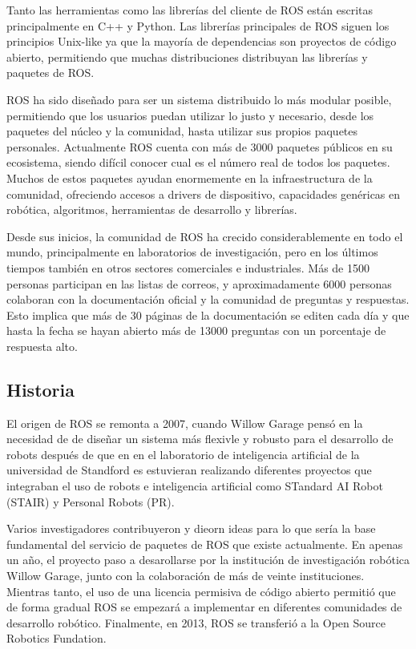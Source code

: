 Tanto las herramientas como las librerías del cliente de ROS están escritas
principalmente en C++ y Python. Las librerías principales de ROS siguen los
principios Unix-like ya que la mayoría de dependencias son proyectos de código
abierto, permitiendo que muchas distribuciones distribuyan las librerías y
paquetes de ROS.

ROS ha sido diseñado para ser un sistema distribuido lo más modular posible,
permitiendo que los usuarios puedan utilizar lo justo y necesario, desde los
paquetes del núcleo y la comunidad, hasta utilizar sus propios paquetes
personales. Actualmente ROS cuenta con más de 3000 paquetes públicos en su
ecosistema, siendo difícil conocer cual es el número real de todos los paquetes.
Muchos de estos paquetes ayudan enormemente en la infraestructura de la
comunidad, ofreciendo accesos a drivers de dispositivo, capacidades genéricas en
robótica, algoritmos, herramientas de desarrollo y librerías.

Desde sus inicios, la comunidad de ROS ha crecido considerablemente en todo el
mundo, principalmente en laboratorios de investigación, pero en los últimos
tiempos también en otros sectores comerciales e industriales. Más de 1500
personas participan en las listas de correos, y aproximadamente 6000 personas
colaboran con la documentación oficial y la comunidad de preguntas y respuestas.
Esto implica que más de 30 páginas de la documentación se editen cada día y que
hasta la fecha se hayan abierto más de 13000 preguntas con un porcentaje de
respuesta alto.

\subsection{Historia}

El origen de ROS se remonta a 2007, cuando Willow Garage pensó en la necesidad
de de diseñar un sistema más flexivle y robusto para el desarrollo de robots
después de que en en el laboratorio de inteligencia artificial de la universidad
de Standford es estuvieran realizando diferentes proyectos que integraban el uso
de robots e inteligencia artificial como STandard AI Robot (STAIR) y Personal
Robots (PR).

Varios investigadores contribuyeron y dieorn ideas para lo que sería la base
fundamental del servicio de paquetes de ROS que existe actualmente. En apenas un
año, el proyecto paso a desarollarse por la institución de investigación
robótica Willow Garage, junto con la colaboración de más de veinte
instituciones. Mientras tanto, el uso de una licencia permisiva de código
abierto permitió que de forma gradual ROS se empezará a implementar en
diferentes comunidades de desarrollo robótico. Finalmente, en 2013, ROS se
transferió a la Open Source Robotics Fundation.

